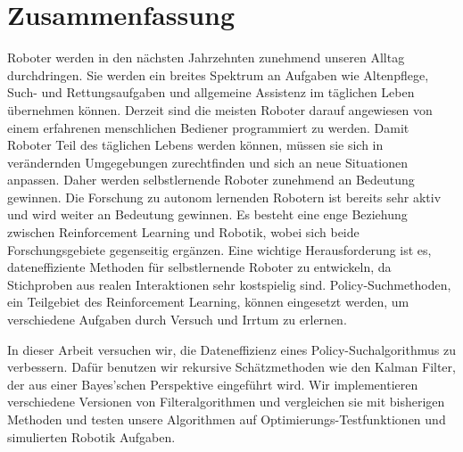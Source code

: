 
\chapter*{Zusammenfassung}
Roboter werden in den nächsten Jahrzehnten zunehmend unseren
Alltag durchdringen. Sie werden ein breites Spektrum an
Aufgaben wie Altenpflege, Such- und Rettungsaufgaben und allgemeine
Assistenz im täglichen Leben übernehmen können.
Derzeit sind die meisten Roboter darauf angewiesen von einem
erfahrenen menschlichen Bediener programmiert zu werden.
Damit Roboter Teil des täglichen Lebens werden können, müssen sie
sich in verändernden Umgegebungen zurechtfinden und sich an
neue Situationen anpassen.
Daher werden selbstlernende Roboter zunehmend an Bedeutung gewinnen.
Die Forschung zu autonom lernenden Robotern ist
bereits sehr aktiv und wird weiter an Bedeutung gewinnen.
Es besteht eine enge Beziehung zwischen Reinforcement Learning und
Robotik, wobei sich beide Forschungsgebiete gegenseitig ergänzen.
Eine wichtige Herausforderung ist es, dateneffiziente Methoden
für selbstlernende Roboter zu entwickeln, da Stichproben
aus realen Interaktionen sehr kostspielig sind.
Policy-Suchmethoden, ein Teilgebiet des Reinforcement Learning,
können eingesetzt werden, um verschiedene Aufgaben durch Versuch und Irrtum
zu erlernen.

In dieser Arbeit versuchen wir, die Dateneffizienz eines
Policy-Suchalgorithmus zu verbessern.
Dafür benutzen wir rekursive Schätzmethoden wie den Kalman
Filter, der aus einer Bayes'schen Perspektive eingeführt wird.
Wir implementieren verschiedene Versionen von Filteralgorithmen
und vergleichen sie mit bisherigen Methoden
und testen unsere Algorithmen auf Optimierungs-Testfunktionen
und simulierten Robotik Aufgaben.

